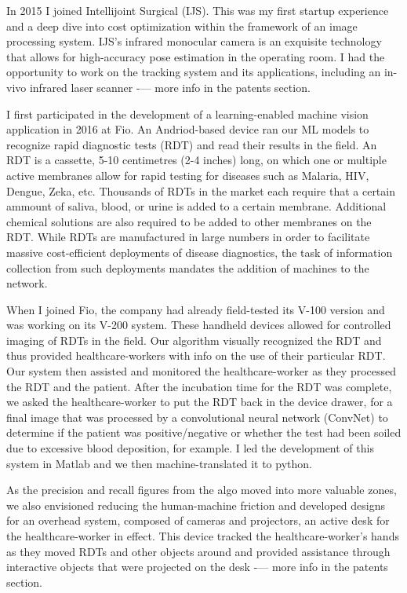 \vspace{0.5cm}
In 2015 I joined Intellijoint Surgical (IJS). This was my first startup experience and a deep dive into cost optimization within the framework of an image processing system. IJS's infrared monocular camera is an exquisite technology that allows for high-accuracy pose estimation in the operating room. I had the opportunity to work on the tracking system and its applications, including an in-vivo infrared laser scanner -— more info in the patents section.

\vspace{0.5cm}
I first participated in the development of a learning-enabled machine vision application in 2016 at Fio. An Andriod-based device ran our ML models to recognize rapid diagnostic tests (RDT) and read their results in the field. An RDT is a cassette, 5-10 centimetres (2-4 inches) long, on which one or multiple active membranes allow for rapid testing for diseases such as Malaria, HIV, Dengue, Zeka, etc. Thousands of RDTs in the market each require that a certain ammount of saliva, blood, or urine is added to a certain membrane. Additional chemical solutions are also required to be added to other membranes on the RDT. While RDTs are manufactured in large numbers in order to facilitate massive cost-efficient deployments of disease diagnostics, the task of information collection from such deployments mandates the addition of machines to the network. 

\vspace{0.5cm}
When I joined Fio, the company had already field-tested its V-100 version and was working on its V-200 system. These handheld devices allowed for controlled imaging of RDTs in the field. Our algorithm visually recognized the RDT and thus provided healthcare-workers with info on the use of their particular RDT. Our system then assisted and monitored the healthcare-worker as they processed the RDT and the patient. After the incubation time for the RDT was complete, we asked the healthcare-worker to put the RDT back in the device drawer, for a final image that was processed by a convolutional neural network (ConvNet) to determine if the patient was positive/negative or whether the test had been soiled due to excessive blood deposition, for example. I led the development of this system in Matlab and we then machine-translated it to python. 
 
\vspace{0.5cm}
As the precision and recall figures from the algo moved into more valuable zones, we also envisioned reducing the human-machine friction and developed designs for an overhead system, composed of cameras and projectors, an active desk for the healthcare-worker in effect. This device tracked the healthcare-worker's hands as they moved RDTs and other objects around and provided assistance through interactive objects that were projected on the desk -— more info in the patents section.

